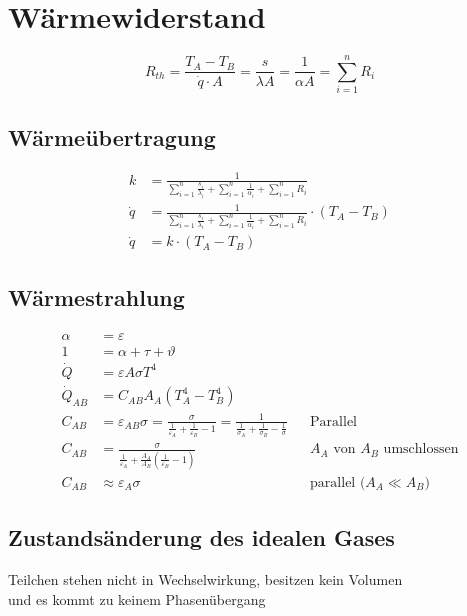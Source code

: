 \section{Wärmewiderstand}

\[R_{th}=\frac{T_A-T_B}{\dot{q}\cdot A}=\frac{s}{\lambda A}=\frac{1}{\alpha A}=\sum_{i=1}^n R_{i}\]

\subsection{Wärmeübertragung}
\begin{align*}
k&=\frac{1}{\sum_{i=1}^n\frac{s_i}{\lambda_i}+\sum_{i=1}^n\frac{1}{\alpha_i}+\sum_{i=1}^n R_{i}}\\
\dot{q}&=\frac{1}{\sum_{i=1}^n\frac{s_i}{\lambda_i}+\sum_{i=1}^n\frac{1}{\alpha_i}+\sum_{i=1}^n R_{i}}\cdot\left(T_A-T_B\right)\\
\dot{q}&=k\cdot\left(T_A-T_B\right)
\end{align*}

\subsection{Wärmestrahlung}
\begin{align*}
\alpha&=\varepsilon\\
1&=\alpha+\tau+\vartheta\\
\dot{Q}&=\varepsilon A \sigma T^4\\
\dot{Q}_{AB}&=C_{AB}A_A\left(T_A^4-T_B^4\right)\\
C_{AB}&=\varepsilon_{AB}\sigma=\frac{\sigma}{\frac{1}{\varepsilon_A}+\frac{1}{\varepsilon_B}-1}=\frac{1}{\frac{1}{\sigma_A}+\frac{1}{\sigma_B}-\frac{1}{\sigma}}&&\text{Parallel}\\
C_{AB}&=\frac{\sigma}{\frac{1}{\varepsilon_A}+\frac{A_A}{A_B}\left(\frac{1}{\varepsilon_B}-1\right)}&&\text{$A_A$ von $A_B$ umschlossen}\\
C_{AB}&\approx\varepsilon_A\sigma&&\text{parallel ($A_A\ll A_B$)}
\end{align*}

\subsection{Zustandsänderung des idealen Gases}
Teilchen stehen nicht in Wechselwirkung, besitzen kein Volumen \\ und es kommt zu keinem Phasenübergang

